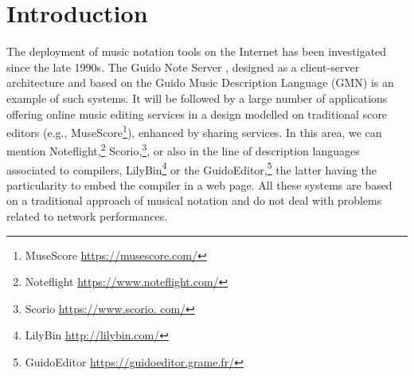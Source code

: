 \documentclass{article}
\title{\papertitle}
\begin{document}
%
\capstartfalse
\maketitle
\capstarttrue
%
\begin{abstract}
We present an online environment for the design of musical scores, also allowing for the embedding of signal processors and hence the publication of electronic works. This environment is part of the INScore project. Its latest version has been transcribed to WebAssembly/Javascript to provide in a web browser the same features as in its native counterpart: the diversity of music representations supported by INScore, the interaction capabilities and all the dynamic aspects of the score.

After some historical elements about distributed musical scores, we will provide some reminders about the INScore project and its associated description language. We will then describe the architecture of the system and the choices made for its portability to the Web. Then, we will present the extensions specific to the Javascript version and in particular the support of signal processing objects. 
Finally, we will show how INScore's communication system has been extended to allow online musical score control from a native version of INScore, paving the way for real-time performance on the web.

\end{abstract}


\section{Introduction}\label{sec:introduction}

The deployment of music notation tools on the Internet has been investigated since the late 1990s. The Guido Note Server \cite{renz98}, designed as a client-server architecture and based on the Guido Music Description Language \cite{hoos98} (GMN) is an example of such systems. It will be followed by a large number of applications offering online music editing services in a design modelled on traditional score editors (e.g., MuseScore\footnote{MuseScore \url{https://musescore.com/}}), enhanced by sharing services. 
In this area, we can mention Noteflight,\footnote{Noteflight \url{https://www.noteflight.com/}} Scorio,\footnote{Scorio \url{https://www.scorio. com/}}, or also in the line of description languages associated to compilers, LilyBin\footnote{LilyBin \url{http://lilybin.com/}} or the GuidoEditor,\footnote{GuidoEditor \url{https://guidoeditor.grame.fr/}} the latter having the particularity to embed the compiler in a web page.
All these systems are based on a traditional approach of musical notation and do not deal with problems related to network performances.
\end{document}
